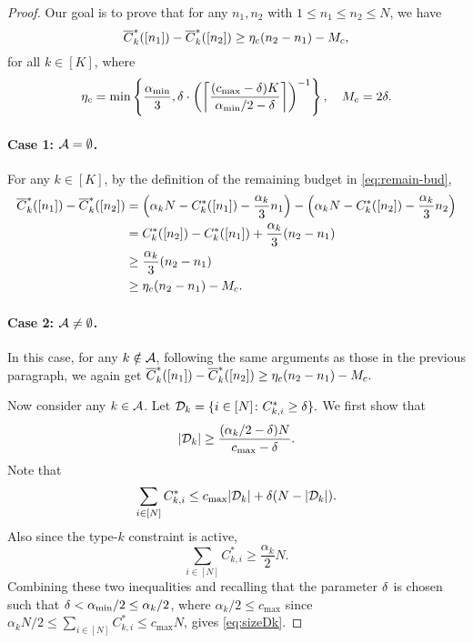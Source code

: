\begin{proof}
Our goal is to prove that for any $n_1,n_2$ with $1\le n_1\le n_2\le N$, we have
\begin{equation}
    \overline{C}^*_k([n_1])-\overline{C}^*_k([n_2])\ge \eta_c(n_2-n_1)-M_c,
\end{equation}
for all $k\in[K]$, where
\begin{align*}
    \eta_c = \min\left\{ \frac{\alpha_{\min}}{3},\delta\cdot\left(\left\lceil \frac{(c_{\max}-\delta)K}{\alpha_{\min}/2-\delta}\right\rceil\right)^{-1} \right\}, \quad M_c = 2\delta.
\end{align*}


\paragraph{Case 1: $\mathcal{A}=\emptyset$.}
For any $k\in[K]$, by the definition of the remaining budget in \eqref{eq:remain-bud},
\begin{align*}
    \overline{C}^*_k([n_1])-\overline{C}^*_k([n_2])&=\left(\alpha_k N - C_k^*([n_1])-\frac{\alpha_k}{3}n_1\right) - \left(\alpha_k N - C_k^*([n_2])-\frac{\alpha_k}{3}n_2\right)\\
    &= C_k^*([n_2])- C_k^*([n_1]) + \frac{\alpha_k}{3}(n_2-n_1)\\
    &\ge \frac{\alpha_k}{3}(n_2-n_1)\\
    &\ge \eta_c(n_2-n_1)-M_c.
\end{align*}

\paragraph{Case 2: $\mathcal{A}\neq \emptyset$.}
In this case, for any $k\notin \mathcal{A}$, following the same arguments as those in the previous paragraph, we again get $\overline{C}^*_k([n_1])-\overline{C}^*_k([n_2])\ge \eta_c(n_2-n_1)-M_c.$

Now consider any $k\in\mathcal{A}$.
Let $\mathcal{D}_k=\{i\in[N]\colon C_{k,i}^*\ge \delta\}.$
We first show that
\begin{equation}\label{eq:sizeDk}
\left\lvert\mathcal{D}_k\right\rvert\geq \frac{(\alpha_k/2-\delta)N}{c_{\max}-\delta}.
\end{equation}
Note that 
\begin{equation}
    \sum_{i\in [N]} C_{k,i}^* \leq c_{\max}|\mathcal{D}_k|+\delta (N-|\mathcal{D}_k|).
\end{equation}
Also since the type-$k$ constraint is active,
\begin{equation}
    \sum_{i\in[N]} C_{k,i}^* \ge \frac{\alpha_k}{2}N.
\end{equation}
Combining these two inequalities and recalling that the parameter $\delta$ is chosen such that $\delta<\alpha_{\min}/2\le \alpha_k/2$, where $\alpha_k/2 \le c_{\max}$ since $\alpha_kN/2\le \sum_{i\in[N]} C_{k,i}^*\le c_{\max}N$,
gives \eqref{eq:sizeDk}.


\end{proof}
